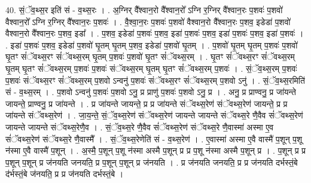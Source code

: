 \documentclass[17pt]{extarticle}
\begin{document}
40. सं॒ॅव॒थ्स॒र इति॑ सं - व॒थ्स॒रः । . अ॒ग्निर् वै᳚श्वान॒रो वै᳚श्वान॒रो᳚ ऽग्नि र॒ग्निर् वै᳚श्वान॒रः प॒शवः॑ प॒शवो॑ वैश्वान॒रो᳚ ऽग्नि र॒ग्निर् वै᳚श्वान॒रः प॒शवः॑ । . वै॒श्वा॒न॒रः प॒शवः॑ प॒शवो॑ वैश्वान॒रो वै᳚श्वान॒रः प॒शव॒ इडेडा॑ प॒शवो॑ वैश्वान॒रो वै᳚श्वान॒रः प॒शव॒ इडा᳚ । . प॒शव॒ इडेडा॑ प॒शवः॑ प॒शव॒ इडा॑ प॒शवः॑ प॒शव॒ इडा॑ प॒शवः॑ प॒शव॒ इडा॑ प॒शवः॑ । . इडा॑ प॒शवः॑ प॒शव॒ इडेडा॑ प॒शवो॑ घृ॒तम् घृ॒तम् प॒शव॒ इडेडा॑ प॒शवो॑ घृ॒तम् । . प॒शवो॑ घृ॒तम् घृ॒तम् प॒शवः॑ प॒शवो॑ घृ॒तꣳ सं॑ॅवथ्स॒रꣳ सं॑ॅवथ्स॒रम् घृ॒तम् प॒शवः॑ प॒शवो॑ घृ॒तꣳ सं॑ॅवथ्स॒रम् । . घृ॒तꣳ सं॑ॅवथ्स॒रꣳ सं॑ॅवथ्स॒रम् घृ॒तम् घृ॒तꣳ सं॑ॅवथ्स॒रम् प॒शवः॑ प॒शवः॑ संॅवथ्स॒रम् घृ॒तम् घृ॒तꣳ सं॑ॅवथ्स॒रम् प॒शवः॑ । . सं॒ॅव॒थ्स॒रम् प॒शवः॑ प॒शवः॑ संॅवथ्स॒रꣳ सं॑ॅवथ्स॒रम् प॒शवो ऽन्वनु॑ प॒शवः॑ संॅवथ्स॒रꣳ सं॑ॅवथ्स॒रम् प॒शवो ऽनु॑ । . सं॒ॅव॒थ्स॒रमिति॑ सं - व॒थ्स॒रम् । . प॒शवो ऽन्वनु॑ प॒शवः॑ प॒शवो ऽनु॒ प्र प्राणु॑ प॒शवः॑ प॒शवो ऽनु॒ प्र । . अनु॒ प्र प्राण्वनु॒ प्र जा॑यन्ते जायन्ते॒ प्राण्वनु॒ प्र जा॑यन्ते । . प्र जा॑यन्ते जायन्ते॒ प्र प्र जा॑यन्ते संॅवथ्स॒रेण॑ संॅवथ्स॒रेण॑ जायन्ते॒ प्र प्र जा॑यन्ते संॅवथ्स॒रेण॑ । . जा॒य॒न्ते॒ सं॒ॅव॒थ्स॒रेण॑ संॅवथ्स॒रेण॑ जायन्ते जायन्ते संॅवथ्स॒रे णै॒वैव सं॑ॅवथ्स॒रेण॑ जायन्ते जायन्ते संॅवथ्स॒रेणै॒व । . सं॒ॅव॒थ्स॒रे णै॒वैव सं॑ॅवथ्स॒रेण॑ संॅवथ्स॒रे णै॒वास्मा॑ अस्मा ए॒व सं॑ॅवथ्स॒रेण॑ संॅवथ्स॒रे णै॒वास्मै᳚ । . सं॒ॅव॒थ्स॒रेणेति॑ सं - व॒थ्स॒रेण॑ । . ए॒वास्मा॑ अस्मा ए॒वै वास्मै॑ प॒शून् प॒शू न॑स्मा ए॒वै वास्मै॑ प॒शून् । . अ॒स्मै॒ प॒शून् प॒शू न॑स्मा अस्मै प॒शून् प्र प्र प॒शू न॑स्मा अस्मै प॒शून् प्र । . प॒शून् प्र प्र प॒शून् प॒शून् प्र ज॑नयति जनयति॒ प्र प॒शून् प॒शून् प्र ज॑नयति । . प्र ज॑नयति जनयति॒ प्र प्र ज॑नयति दर्भस्तं॒बे द॑र्भस्तं॒बे ज॑नयति॒ प्र प्र ज॑नयति दर्भस्तं॒बे । \newline
\end{document}
